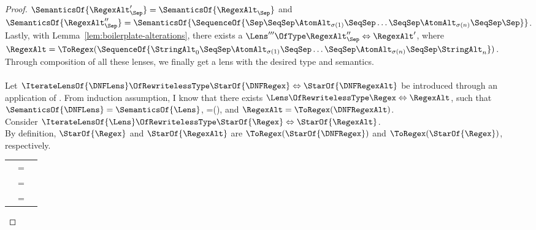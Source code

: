 \documentclass[sigplan,acmsmall]{acmart}
\begin{document}
\begin{lemma}
\begin{proof}
    $\SemanticsOf{\RegexAlt_{\Sep}'}=\SemanticsOf{\RegexAlt_{\Sep}}$ and 
    $\SemanticsOf{\RegexAlt_{\Sep}''}=\SemanticsOf{\SequenceOf{\Sep \SeqSep  \AtomAlt_{\sigma(1)}  \SeqSep  \ldots  \SeqSep  \AtomAlt_{\sigma(n)}  \SeqSep  \Sep}}$.
    Lastly, with Lemma~\ref{lem:boilerplate-alterations}, there exists a
    $\Lens''' \OfType \RegexAlt_{\Sep}'' \Leftrightarrow \RegexAlt'$, where
    $\RegexAlt = \ToRegex(\SequenceOf{\StringAlt_0 \SeqSep  \AtomAlt_{\sigma(1)}  \SeqSep  \ldots  \SeqSep  \AtomAlt_{\sigma(n)}  \SeqSep  \StringAlt_n})$.
    Through composition of all these lenses, we finally get a lens with the desired type
    and semantics.\\
    \\
    Let $\IterateLensOf{\DNFLens} \OfRewritelessType \StarOf{\DNFRegex} \Leftrightarrow \StarOf{\DNFRegexAlt}$
    be introduced through an application of \AtomLensRule{}.
    From induction assumption, I know that there exists $\Lens \OfRewritelessType \Regex \Leftrightarrow \RegexAlt$, such that
    $\SemanticsOf{\DNFLens}=\SemanticsOf{\Lens}$,
    \Regex=\ToRegex(\DNFRegex), and
    $\RegexAlt=\ToRegex(\DNFRegexAlt)$.\\
    Consider $\IterateLensOf{\Lens} \OfRewritelessType \StarOf{\Regex} \Leftrightarrow \StarOf{\RegexAlt}$.\\
    By definition, $\StarOf{\Regex}$ and $\StarOf{\RegexAlt}$ are $\ToRegex(\StarOf{\DNFRegex})$
    and $\ToRegex(\StarOf{\Regex})$, respectively.

    \begin{tabular}{RcL}
      \SemanticsOf{\IterateLensOf{\Lens}} & = &
                                                \\
                                          & = &
                                                \\
                                          & = &
                                                \SemanticsOf{\IterateLensOf{\DNFLens}}
    \end{tabular}
  \end{proof}
\end{lemma}
\end{document}
